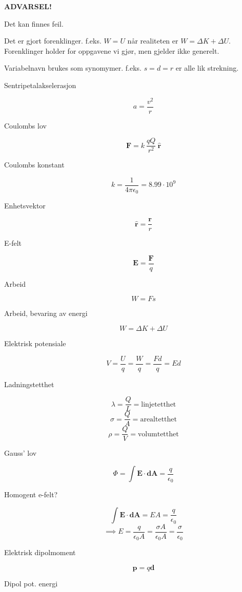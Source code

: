 \textbf{ADVARSEL!}

Det kan finnes feil.

Det er gjort forenklinger.
f.eks. $W = U$ når realiteten er $W = \Delta K + \Delta U$.
Forenklinger holder for oppgavene vi gjør, men gjelder ikke generelt.

Variabelnavn brukes som synomymer.
f.eks. $s = d = r$ er alle lik strekning.

\begin{description}
  \item [Sentripetalakselerasjon] $$a = \frac{v^2}{r}$$
  \item [Coulombs lov] $$\mathbf{F} = k\ \frac{qQ}{r^2}\ \mathbf{\hat{r}}$$
  \item [Coulombs konstant] $$k = \frac{1}{4\pi\epsilon_0} = 8.99\cdot 10^9$$
  \item [Enhetsvektor] $$\mathbf{\hat{r}} = \frac{\mathbf{r}}{r}$$
  \item [E-felt] $$\mathbf{E} = \frac{\mathbf{F}}{q}$$
  \item [Arbeid] $$W = Fs$$
  \item [Arbeid, bevaring av energi] $$W = \Delta K + \Delta U$$
  \item [Elektrisk potensiale] $$V = \frac{U}{q} = \frac{W}{q}
                               = \frac{Fd}{q} = Ed$$
  \item [Ladningstetthet] $$\lambda = \frac{Q}{L} = \text{linjetetthet}$$
                          $$\sigma = \frac{Q}{A} = \text{arealtetthet}$$
                          $$\rho = \frac{Q}{V} = \text{volumtetthet}$$
  \item [Gauss' lov] $$\Phi = \int\mathbf{E}\cdot\mathbf{dA}
                     = \frac{q}{\epsilon_0}$$
  \item [Homogent e-felt?] $$\int\mathbf{E}\cdot\mathbf{dA}
                           = EA = \frac{q}{\epsilon_0}$$
                           $$\implies E = \frac{q}{\epsilon_0 A}
                           = \frac{\sigma A}{\epsilon_0 A}
                           = \frac{\sigma}{\epsilon_0}$$
  \item [Elektrisk dipolmoment] $$\mathbf{p} = q \mathbf{d}$$
  \item [Dipol pot. energi] $$$$
  \item [] $$$$
\end{description}
